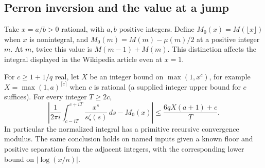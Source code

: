 \subsection{Perron inversion and the value at a jump}

Take $x=a/b>0$ rational, with $a,b$ positive integers. Define
$M_0(x)=M(\lfloor x\rfloor)$ when $x$ is nonintegral, and
$M_0(m)=M(m)-\mu(m)/2$ at a positive integer $m$. At $m$, twice
this value is $M(m-1)+M(m)$. This distinction affects the integral
displayed in the Wikipedia article even at $x=1$.

\begin{theorem}\label{thm:perron}
For $c\ge1+1/q$ real, let $X$ be an integer bound on
$\max(1,x^c)$, for example $X=\max(1,a)^{\lceil c\rceil}$ when
$c$ is rational (a supplied integer upper bound for $c$ suffices).
For every integer $T\ge2c$,
\[
 \left|\frac{1}{2\pi i}\int_{c-iT}^{c+iT}
       \frac{x^s}{s\zeta(s)}\,ds-M_0(x)\right|
 \le \frac{6qX(a+1)+c}{T}.
\]
In particular the normalized integral has a primitive recursive
convergence modulus. The same conclusion holds on named inputs
given a known floor and positive separation from the adjacent integers,
with the corresponding lower bound on $|\log(x/n)|$.
\end{theorem}
